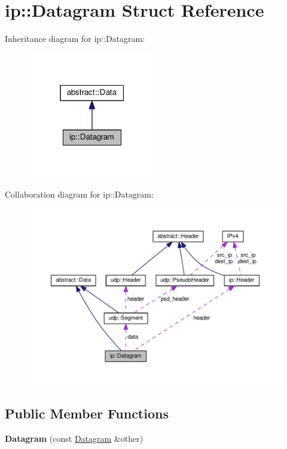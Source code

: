 \hypertarget{structip_1_1Datagram}{}\section{ip\+:\+:Datagram Struct Reference}
\label{structip_1_1Datagram}


Inheritance diagram for ip\+:\+:Datagram\+:\nopagebreak
\begin{figure}[H]
\begin{center}
\leavevmode
\includegraphics[width=159pt]{structip_1_1Datagram__inherit__graph}
\end{center}
\end{figure}


Collaboration diagram for ip\+:\+:Datagram\+:\nopagebreak
\begin{figure}[H]
\begin{center}
\leavevmode
\includegraphics[width=350pt]{structip_1_1Datagram__coll__graph}
\end{center}
\end{figure}
\subsection*{Public Member Functions}
\begin{DoxyCompactItemize}
\item 
{\bfseries Datagram} (const \hyperlink{structip_1_1Datagram}{Datagram} \&other)\hypertarget{structip_1_1Datagram_a9b701e9ceeeacc10ae5df56bccde8f51}{}\label{structip_1_1Datagram_a9b701e9ceeeacc10ae5df56bccde8f51}

\end{DoxyCompactItemize}
